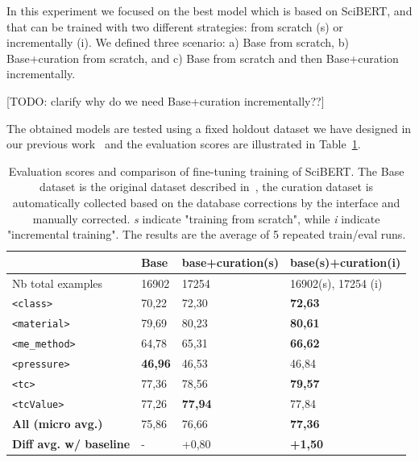 \documentclass{article}
\begin{document}
In this experiment we focused on the best model which is based on SciBERT, and that can be trained with two different strategies: from scratch (s) or incrementally (i).
We defined three scenario: a) Base from scratch, b) Base+curation from scratch, and c) Base from scratch and then Base+curation incrementally.

[TODO: clarify why do we need Base+curation incrementally??]

The obtained models are tested using a fixed holdout dataset we have designed in our previous work~\cite{lfoppiano2023automatic} and the evaluation scores are illustrated in Table~\ref{tab:evaluation-curation-training}.

\begin{table}[h]
\centering
\begin{tabular}{|l|l|l|l|}
\hline
& \textbf{Base} & \textbf{base+curation(s)} & \textbf{base(s)+curation(i)} \\ 
\hline
\hline
Nb total examples & 16902 & 17254 & 16902(s), 17254 (i)\\ 
\hline
\texttt{<class>}        & 70,22             & 72,30             & \textbf{72,63} \\ 
\texttt{<material>}     & 79,69             & 80,23             & \textbf{80,61} \\ 
\texttt{<me\_method>}   & 64,78             & 65,31             & \textbf{66,62} \\ 
\texttt{<pressure>}     & \textbf{46,96}    & 46,53             & 46,84 \\ 
\texttt{<tc>}           & 77,36             & 78,56             & \textbf{79,57} \\ 
\texttt{<tcValue>}      & 77,26             & \textbf{77,94}    & 77,84 \\ 
\hline
\textbf{All (micro avg.)} & 75,86           & 76,66             & \textbf{77,36} \\ 
\hline
\textbf{Diff avg. w/ baseline}& -           & +0,80             & \textbf{+1,50} \\ 
\hline
\end{tabular}
\caption{Evaluation scores and comparison of fine-tuning training of SciBERT. The Base dataset is the original dataset described in~\cite{lfoppiano2023automatic}, the curation dataset is automatically collected based on the database corrections by the interface and manually corrected. \textit{s} indicate "training from scratch", while \textit{i} indicate "incremental training". The results are the average of 5 repeated train/eval runs. }
\label{tab:evaluation-curation-training}
\end{table}
\end{document}

